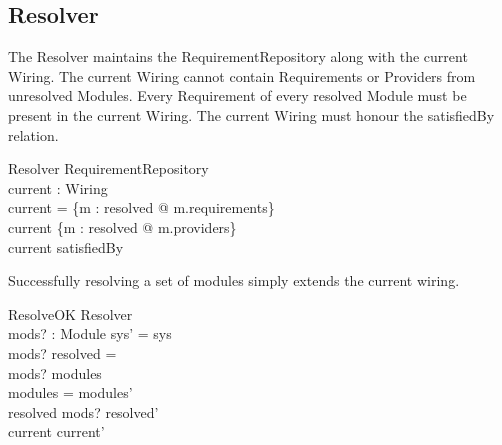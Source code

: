 \documentclass[a4paper,9pt]{article}
\begin{document}
\subsection*{Resolver}

The Resolver maintains the RequirementRepository along with the current Wiring. The current Wiring cannot contain Requirements or Providers from unresolved Modules. Every Requirement of every resolved Module must be present in the current Wiring. The current Wiring must honour the satisfiedBy relation.

\begin{schema}{Resolver}
 RequirementRepository \\
 current : Wiring \\
\where
 \dom current = \bigcup \{m : resolved @ m.requirements\} \\
 \ran current \subseteq \bigcup \{m : resolved @ m.providers\}\\
 current \subseteq satisfiedBy
\end{schema}

Successfully resolving a set of modules simply extends the current wiring.

\begin{schema}{ResolveOK}
 \Delta Resolver \\
 mods? : \power Module
\where
 sys' = sys \\
 mods? \cap resolved = \emptyset \\
 mods? \subseteq modules \\
 modules = modules' \\
 resolved \cup mods? \subseteq resolved' \\
 current \subseteq current' \\
\end{schema}
\end{document}
